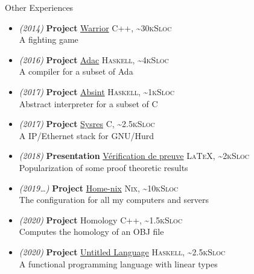 \documentclass[a4paper,11pt]{extarticle}
\newcommand{\cvtitle}[1]{
    \begin{tcolorbox}[colback=sidebg,colframe=sidefg,coltext=sidetext,
        height=1cm, valign=center, sharp corners=downhill]
        {\Large #1}
    \end{tcolorbox}
}
\newcommand{\lang}[2]{\hfill \textsc{\scriptsize #1, \textasciitilde#2Sloc}}
\begin{document}
\begin{minipage}[c][282mm][t]{0.60\linewidth}
{        \cvtitle{Other Experiences}

        \begin{itemize}
          \itemsep0em
          \item \emph{\small (2014)} \textbf{Project} \href{https://github.com/DWARVES/Project-Warrior}{Warrior}
                \lang{C++}{30k}\\
                A fighting game
          \item \emph{\small (2016)} \textbf{Project} \href{https://github.com/TWal/ENS\_Adac}{Adac}
                \lang{Haskell}{4k}\\
                A compiler for a subset of Ada
          \item \emph{\small (2017)} \textbf{Project} \href{https://github.com/dwarfmaster/absint}{Absint}
                \lang{Haskell}{1k}\\
                Abstract interpreter for a subset of C
          \item \emph{\small (2017)} \textbf{Project} \href{https://github.com/dwarfmaster/ENS_sysres}{Sysres}
                \lang{C}{2.5k}\\
                A IP/Ethernet stack for GNU/Hurd
          \item \emph{\small (2018)} \textbf{Presentation} \href{https://sapt.fr/exposes/verification-automatique-de-preuves-884}{Vérification de preuve}
                \lang{\LaTeX}{2k}\\
                Popularization of some proof theoretic results
          \item \emph{\small (2019\dots)} \textbf{Project} \href{https://github.com/dwarfmaster/home-nix}{Home-nix}
                \lang{Nix}{10k}\\
                The configuration for all my computers and servers
          \item \emph{\small (2020)} \textbf{Project} Homology
                \lang{C++}{1.5k}\\
                Computes the homology of an OBJ file
          \item \emph{\small (2020)} \textbf{Project} \href{https://github.com/math-fehr/Untitled-Language}{Untitled Language}
                \lang{Haskell}{2.5k}\\
                A functional programming language with linear types
        \end{itemize}

      }
    \end{minipage}
\end{document}
